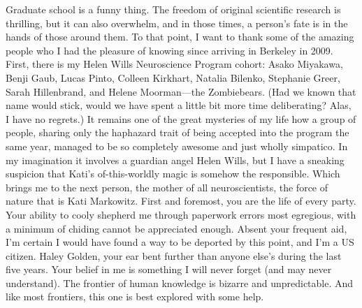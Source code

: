 \documentclass{ucbthesis}
\begin{document}
\begin{frontmatter}
\begin{acknowledgements}
Graduate school is a funny thing. The freedom of original scientific research is thrilling, but it can also overwhelm, and in those times, a person's fate is in the hands of those around them. To that point, I want to thank some of the amazing people who I had the pleasure of knowing since arriving in Berkeley in 2009. First, there is my Helen Wills Neuroscience Program cohort: Asako Miyakawa, Benji Gaub, Lucas Pinto, Colleen Kirkhart, Natalia Bilenko, Stephanie Greer, Sarah Hillenbrand, and Helene Moorman---the Zombiebears. (Had we known that name would stick, would we have spent a little bit more time deliberating? Alas, I have no regrets.) It remains one of the great mysteries of my life how a group of people, sharing only the haphazard trait of being accepted into the program the same year, managed to be so completely awesome and just wholly simpatico. In my imagination it involves a guardian angel Helen Wills, but I have a sneaking suspicion that Kati's of-this-worldly magic is somehow the responsible. Which brings me to the next person, the mother of all neuroscientists, the force of nature that is Kati Markowitz. First and foremost, you are the life of every party. Your ability to cooly shepherd me through paperwork errors most egregious, with a minimum of chiding cannot be appreciated enough. Absent your frequent aid, I'm certain I would have found a way to be deported by this point, and I'm a US citizen. Haley Golden, your ear bent further than anyone else's during the last five years. Your belief in me is something I will never forget (and may never understand). The frontier of human knowledge is bizarre and unpredictable. And like most frontiers, this one is best explored with some help.



\end{acknowledgements}

\end{frontmatter}

\pagestyle{headings}







\printbibliography
\end{document}
